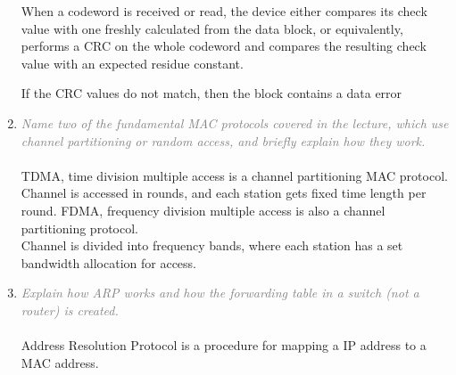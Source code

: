 \documentclass[a4paper,11pt]{article}
\begin{document}
\begin{enumerate}
When a codeword is received or read, the device either compares its check value with one freshly calculated from the data block, or equivalently, performs a CRC on the whole codeword and compares the resulting check value with an expected residue constant.

If the CRC values do not match, then the block contains a data error
\item
\textcolor{gray}{\textit{Name two of the fundamental MAC protocols covered in
the lecture, which use channel partitioning or random access, and
briefly explain how they work.}}\\ \\
TDMA, time division multiple access is a channel partitioning MAC protocol. \\
Channel is accessed in rounds, and each station gets fixed time length per round.
FDMA, frequency division multiple access is also a channel partitioning protocol.\\
Channel is divided into frequency bands, where each station has a set bandwidth allocation for access.
\item
\textcolor{gray}{\textit{Explain how ARP works and how the forwarding table
in a switch (not a router) is created.}}\\ \\
Address Resolution Protocol is a procedure for mapping a IP address to a MAC address.

\end{enumerate}
\end{document}
